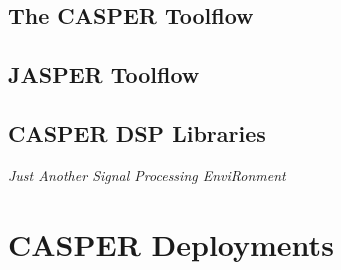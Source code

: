 \documentclass{ws-jai}
\begin{document}
\subsection{The CASPER Toolflow}


\subsection{JASPER Toolflow}


\subsection{CASPER DSP Libraries}


\emph{Just Another Signal Processing EnviRonment}


\section{CASPER Deployments} \label{sec:Deployments}
\end{document}
